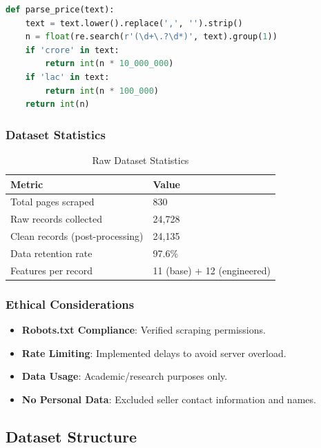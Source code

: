 \documentclass[12pt,a4paper]{article}
\begin{document}
\begin{lstlisting}[language=Python, caption=Price Parsing Function]
def parse_price(text):
    text = text.lower().replace(',', '').strip()
    n = float(re.search(r'(\d+\.?\d*)', text).group(1))
    if 'crore' in text:
        return int(n * 10_000_000)
    if 'lac' in text:
        return int(n * 100_000)
    return int(n)
\end{lstlisting}

\subsubsection{Dataset Statistics}

\begin{table}[H]
\centering
\caption{Raw Dataset Statistics}
\begin{tabular}{@{}ll@{}}
\toprule
\textbf{Metric} & \textbf{Value} \\ \midrule
Total pages scraped       & 830 \\
Raw records collected     & 24,728 \\
Clean records (post-processing) & 24,135 \\
Data retention rate       & 97.6\% \\
Features per record       & 11 (base) + 12 (engineered) \\
\bottomrule
\end{tabular}
\end{table}

\subsubsection{Ethical Considerations}

\begin{itemize}
    \item \textbf{Robots.txt Compliance}: Verified scraping permissions.
    \item \textbf{Rate Limiting}: Implemented delays to avoid server overload.
    \item \textbf{Data Usage}: Academic/research purposes only.
    \item \textbf{No Personal Data}: Excluded seller contact information and names.
\end{itemize}

\subsection{Dataset Structure}
\end{document}
